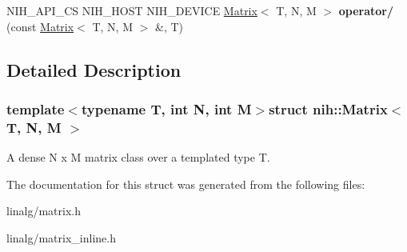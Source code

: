 \begin{DoxyCompactItemize}
\item 
\hypertarget{group__linalg_ga24d2f0d22492f9e3d3807af392e5fd12}{
\-N\-I\-H\-\_\-\-A\-P\-I\-\_\-\-C\-S \-N\-I\-H\-\_\-\-H\-O\-S\-T \-N\-I\-H\-\_\-\-D\-E\-V\-I\-C\-E \*
\hyperlink{structnih_1_1_matrix}{\-Matrix}$<$ \-T, \-N, \-M $>$ {\bfseries operator/} (const \hyperlink{structnih_1_1_matrix}{\-Matrix}$<$ \-T, \-N, \-M $>$ \&, \-T)}
\label{group__linalg_ga24d2f0d22492f9e3d3807af392e5fd12}

\end{DoxyCompactItemize}


\subsection{\-Detailed \-Description}
\subsubsection*{template$<$typename \-T, int \-N, int \-M$>$struct nih\-::\-Matrix$<$ T, N, M $>$}

\-A dense \-N x \-M matrix class over a templated type \-T. 

\-The documentation for this struct was generated from the following files\-:\begin{DoxyCompactItemize}
\item 
linalg/matrix.\-h\item 
linalg/matrix\-\_\-inline.\-h\end{DoxyCompactItemize}
